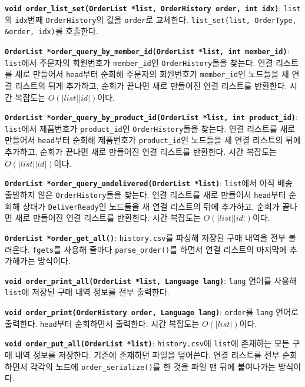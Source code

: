 \documentclass[runningheads]{llncs}
\begin{document}
\textbf{\texttt{void order_list_set(OrderList *list, OrderHistory order, int idx)}}: \texttt{list}의 \texttt{idx}번째 \texttt{OrderHistory}의 값을 \texttt{order}로 교체한다. \texttt{list_set(list, OrderType, \&order, idx)}를 호출한다.

\textbf{\texttt{OrderList *order_query_by_member_id(OrderList *list, int member_id)}}: \texttt{list}에서 주문자의 회원번호가 \texttt{member_id}인 \texttt{OrderHistory}들을 찾는다. 연결 리스트를 새로 만들어서 \texttt{head}부터 순회해 주문자의 회원번호가 \texttt{member_id}인 노드들을 새 연결 리스트의 뒤게 추가하고, 순회가 끝나면 새로 만들어진 연결 리스트를 반환한다. 시간 복잡도는 $O(\left|list\right|\left|id\right|)$이다.

\textbf{\texttt{OrderList *order_query_by_product_id(OrderList *list, int product_id)}}: \texttt{list}에서 제품번호가 \texttt{product_id}인 \texttt{OrderHistory}들을 찾는다. 연결 리스트를 새로 만들어서 \texttt{head}부터 순회해 제품번호가 \texttt{product_id}인 노드들을 새 연결 리스트의 뒤에 추가하고, 순회가 끝나면 새로 만들어진 연결 리스트를 반환한다. 시간 복잡도는 $O(\left|list\right|\left|id\right|)$이다.

\textbf{\texttt{OrderList *order_query_undelivered(OrderList *list)}}: \texttt{list}에서 아직 배송 출발하지 않은 \texttt{OrderHistory}들을 찾는다. 연결 리스트를 새로 만들어서 \texttt{head}부터 순회해 상태가 \texttt{DeliverReady}인 노드들을 새 연결 리스트의 뒤에 추가하고, 순회가 끝나면 새로 만들어진 연결 리스트를 반환한다. 시간 복잡도는 $O(\left|list\right|\left|id\right|)$이다.

\textbf{\texttt{OrderList *order_get_all()}}: \texttt{history.csv}를 파싱해 저장된 구매 내역을 전부 불러온다. \texttt{fgets}를 사용해 줄마다 \texttt{parse_order()}를 하면서 연결 리스트의 마지막에 추가해가는 방식이다.

\textbf{\texttt{void order_print_all(OrderList *list, Language lang)}}: \texttt{lang} 언어를 사용해 \texttt{list}에 저장된 구매 내역 정보를 전부 출력한다.

\textbf{\texttt{void order_print(OrderHistory order, Language lang)}}: \texttt{order}를 \texttt{lang} 언어로 출력한다. \texttt{head}부터 순회하면서 출력한다. 시간 복잡도는 $O(\left|list\right|)$이다.

\textbf{\texttt{void order_put_all(OrderList *list)}}: \texttt{history.csv}에 \texttt{list}에 존재하는 모든 구매 내역 정보를 저장한다. 기존에 존재하던 파일을 덮어쓴다. 연결 리스트를 전부 순회하면서 각각의 노드에 \texttt{order_serialize()}를 한 것을 파일 맨 뒤에 붙여나가는 방식이다.
\end{document}
